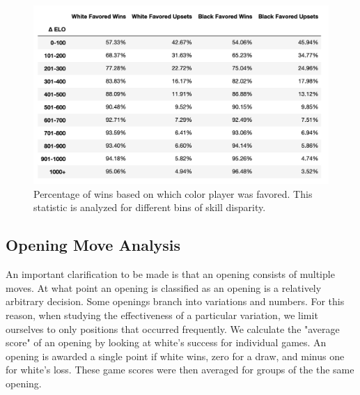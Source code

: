 \documentclass[reprint,
 amsmath,amssymb,nobibnotes,
 aps, floatfix]{revtex4-1}
\begin{document}
\begin{figure}
    \centering
    \includegraphics[scale=.4]{davis_image6.png}
    \caption{Percentage of wins based on which color player was favored. This statistic is analyzed for different bins of skill disparity.}
    \label{fig:elo_bin_upset}
\end{figure}

\subsection{Opening Move Analysis}
An important clarification to be made is that an opening consists of multiple moves. At what point an opening is classified as an opening is a relatively arbitrary decision. Some openings branch into variations and numbers. For this reason, when studying the effectiveness of a particular variation, we limit ourselves to only positions that occurred frequently. We calculate the "average score" of an opening by looking at white's success for individual games. An opening is awarded a single point if white wins, zero for a draw, and minus one for white's loss. These game scores were then averaged for groups of the the same opening. 
\end{document}
